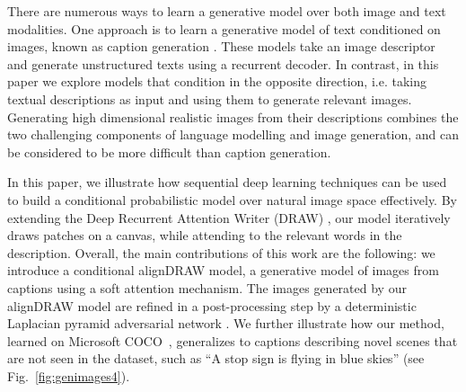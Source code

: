\documentclass{article} %
\newcommand{\Figref}[1]{Fig.~\ref{#1}}
\begin{document}
There are numerous ways to learn a generative model over both image and text modalities. One approach is to learn a generative model of text conditioned on images, known as caption generation
\citep{karpathy_captions,vinyals_captions,xu_captions}. These models take an image descriptor and generate unstructured texts using a recurrent decoder. In contrast, in this paper we explore models that condition in the opposite direction, i.e. taking textual descriptions as input and using them to generate relevant images.
Generating high dimensional realistic images from their descriptions 
combines the two challenging components of language modelling and image generation, and can be considered to be more difficult than caption generation. %

In this paper, we illustrate how sequential deep learning techniques can be used to build a conditional probabilistic model over natural image space effectively. By extending the Deep Recurrent Attention Writer (DRAW) \citep{gregor_draw}, our model iteratively draws patches on a canvas, while attending to the relevant words in the description. Overall, the main contributions of this work are the following: we introduce a conditional alignDRAW model, a generative model of images from captions using a soft attention mechanism. The images generated by our alignDRAW model are refined in a post-processing step by a deterministic Laplacian pyramid adversarial network \citep{denton_lapgan}. We further 
illustrate how our method, learned on Microsoft COCO~\citep{mscoco}, generalizes to captions describing novel scenes that are not 
seen in the dataset, such as ``A stop sign is flying in blue skies'' (see \Figref{fig:genimages4}). 
\end{document}

